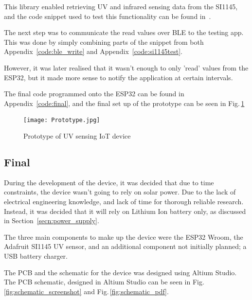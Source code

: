 \documentclass[12pt,openany,a4paper]{book}
\newcommand{\fig}[1]  {Fig.\,\ref{#1}}		%
\newcommand{\secn}[1] {Section~\ref{#1}}	%
\newcommand{\app}[1]  {Appendix~\ref{#1}}	%
\begin{document}
This library enabled retrieving UV and infrared sensing data from the SI1145,
and the code snippet used to test this functionality can be found
in~\cite[\app{code:si1145test}]{adafruit_code}.

The next step was to communicate the read values over BLE to the testing app.
This was done by simply combining parts of the snippet from both \app{code:ble_write} and \app{code:si1145test}.

However, it was later realised that it wasn't enough to only 'read' values from
the ESP32, but it made more sense to notify the application at certain
intervals.



The final code programmed onto the ESP32 can be found in \app{code:final}, and
the final set up of the prototype can be seen in \fig{fig:prototype}

\begin{figure}[h]
\centering\texttt{[image: Prototype.jpg]}
\caption{Prototype of UV sensing IoT device}
\label{fig:prototype}
\end{figure}

\subsection{Final}

During the development of the device, it was decided that due to time
constraints, the device wasn't going to rely on solar power. Due to the lack of
electrical engineering knowledge, and lack of time for thorough reliable
research. Instead, it was decided that it will rely on Lithium Ion battery only,
as discussed in \secn{secn:power_supply}.

The three main components to make up the device were the ESP32 Wroom, the
Adafruit SI1145 UV sensor, and an additional component not initially planned;
a USB battery charger.

The PCB and the schematic for the device was designed using Altium Studio. The
PCB schematic, designed in Altium Studio can be seen in \fig{fig:schematic_screenshot} and \fig{fig:schematic_pdf}.
\end{document}

